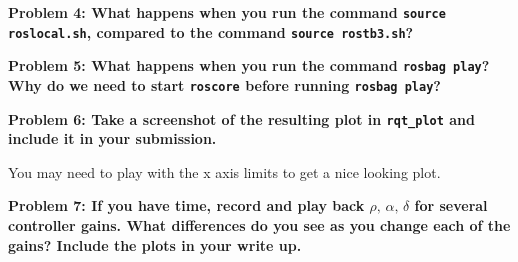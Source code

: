 \documentclass{article}
\begin{document}
\textbf{Problem 4: What happens when you run the command \texttt{source roslocal.sh}, compared to the command \texttt{source rostb3.sh}?}

\textbf{Problem 5: What happens when you run the command \texttt{rosbag play}? Why do we need to start \texttt{roscore} before running \texttt{rosbag play}?}

\textbf{Problem 6: Take a screenshot of the resulting plot in \texttt{rqt\_plot} and include it in your submission.}

You may need to play with the x axis limits to get a nice looking plot.

\textbf{Problem 7: If you have time, record and play back $\rho, \, \alpha, \, \delta$ for several controller gains. What differences do you see as you change each of the gains? Include the plots in your write up.}
\end{document}
